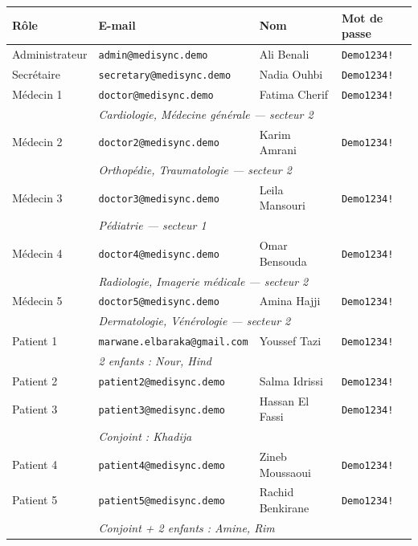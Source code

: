 \documentclass[12pt,a4paper]{report}
\begin{document}
\begin{center}
\small
\begin{tabular}{@{} l l l l @{}}
  \toprule
  \textbf{Rôle} & \textbf{E-mail} & \textbf{Nom} & \textbf{Mot de passe} \\
  \midrule
  Administrateur & \texttt{admin@medisync.demo}              & Ali Benali          & \texttt{Demo1234!} \\
  Secrétaire     & \texttt{secretary@medisync.demo}          & Nadia Ouhbi         & \texttt{Demo1234!} \\
  \midrule
  Médecin 1      & \texttt{doctor@medisync.demo}             & Fatima Cherif       & \texttt{Demo1234!} \\
                 & \multicolumn{3}{l}{\footnotesize\textit{Cardiologie, Médecine générale — secteur 2}} \\[2pt]
  Médecin 2      & \texttt{doctor2@medisync.demo}            & Karim Amrani        & \texttt{Demo1234!} \\
                 & \multicolumn{3}{l}{\footnotesize\textit{Orthopédie, Traumatologie — secteur 2}} \\[2pt]
  Médecin 3      & \texttt{doctor3@medisync.demo}            & Leila Mansouri      & \texttt{Demo1234!} \\
                 & \multicolumn{3}{l}{\footnotesize\textit{Pédiatrie — secteur 1}} \\[2pt]
  Médecin 4      & \texttt{doctor4@medisync.demo}            & Omar Bensouda       & \texttt{Demo1234!} \\
                 & \multicolumn{3}{l}{\footnotesize\textit{Radiologie, Imagerie médicale — secteur 2}} \\[2pt]
  Médecin 5      & \texttt{doctor5@medisync.demo}            & Amina Hajji         & \texttt{Demo1234!} \\
                 & \multicolumn{3}{l}{\footnotesize\textit{Dermatologie, Vénérologie — secteur 2}} \\[2pt]
  \midrule
  Patient 1      & \texttt{marwane.elbaraka@gmail.com}       & Youssef Tazi        & \texttt{Demo1234!} \\
                 & \multicolumn{3}{l}{\footnotesize\textit{2 enfants : Nour, Hind}} \\[2pt]
  Patient 2      & \texttt{patient2@medisync.demo}           & Salma Idrissi       & \texttt{Demo1234!} \\
  Patient 3      & \texttt{patient3@medisync.demo}           & Hassan El Fassi     & \texttt{Demo1234!} \\
                 & \multicolumn{3}{l}{\footnotesize\textit{Conjoint : Khadija}} \\[2pt]
  Patient 4      & \texttt{patient4@medisync.demo}           & Zineb Moussaoui     & \texttt{Demo1234!} \\
  Patient 5      & \texttt{patient5@medisync.demo}           & Rachid Benkirane    & \texttt{Demo1234!} \\
                 & \multicolumn{3}{l}{\footnotesize\textit{Conjoint + 2 enfants : Amine, Rim}} \\
  \bottomrule
\end{tabular}
\end{center}
\end{document}
